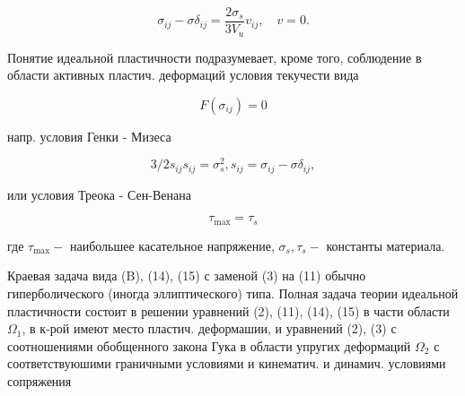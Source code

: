 \documentclass[10pt]{article}
\begin{document}
\[

\sigma_{i j}-\sigma \delta_{i j}=\frac{2 \sigma_{s}}{3 V_{u}} v_{i j}, \quad v=0 .

\]



Понятие идеальной пластичности подразумевает, кроме того, соблюдение в области активных пластич. деформаций условия текучести вида



\[

F\left(\sigma_{i j}\right)=0

\]



напр. условия Генки - Мизеса



\[

3 / 2 s_{i j} s_{i j}=\sigma_{s}^{2}, s_{i j}=\sigma_{i j}-\sigma \delta_{i j},

\]



или условия Треока - Сен-Венана



\[

\tau_{\max }=\tau_{s}

\]



где $\tau_{\max }-$ наибольшее касательное напряжение, $\sigma_{s}, \tau_{s}-$ константы материала.



Краевая задача вида (B), (14), (15) с заменой (3) на (11) обычно гиперболического (иногда эллиптического) типа. Полная задача теории идеальной пластичности состоит в решении уравнений (2), (11), (14), (15) в части области $\Omega_{1}$, в к-рой имеют место пластич. деформашии, и уравнений (2), (3) с соотношениями обобщенного закона Гука в области упругих деформаций $\Omega_{2}$ с соответствуюшими граничными условиями и кинематич. и динамич. условиями сопряжения
\end{document}
